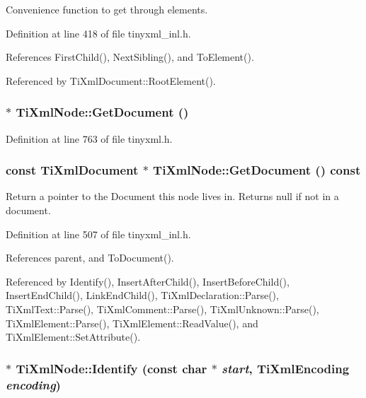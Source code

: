 Convenience function to get through elements. 

Definition at line 418 of file tinyxml\_\-inl.h.

References FirstChild(), NextSibling(), and ToElement().

Referenced by TiXmlDocument::RootElement().\hypertarget{class_ti_xml_node_a7b2372c0e7adfb32f5b6902fe49a39b2}{
\subsubsection[{GetDocument}]{$\ast$ TiXmlNode::GetDocument ()}}
\label{class_ti_xml_node_a7b2372c0e7adfb32f5b6902fe49a39b2}


Definition at line 763 of file tinyxml.h.\hypertarget{class_ti_xml_node_aa66f4ebcd175204a168ed7c2d7b43071}{
\subsubsection[{GetDocument}]{\setlength{\rightskip}{0pt plus 5cm}const {\bf TiXmlDocument} $\ast$ TiXmlNode::GetDocument () const}}
\label{class_ti_xml_node_aa66f4ebcd175204a168ed7c2d7b43071}
Return a pointer to the Document this node lives in. Returns null if not in a document. 

Definition at line 507 of file tinyxml\_\-inl.h.

References parent, and ToDocument().

Referenced by Identify(), InsertAfterChild(), InsertBeforeChild(), InsertEndChild(), LinkEndChild(), TiXmlDeclaration::Parse(), TiXmlText::Parse(), TiXmlComment::Parse(), TiXmlUnknown::Parse(), TiXmlElement::Parse(), TiXmlElement::ReadValue(), and TiXmlElement::SetAttribute().\hypertarget{class_ti_xml_node_ac1e3a8e7578be463b04617786120c2bb}{
\subsubsection[{Identify}]{ $\ast$ TiXmlNode::Identify (const char $\ast$ {\em start}, \/  {\bf TiXmlEncoding} {\em encoding})}}
\label{class_ti_xml_node_ac1e3a8e7578be463b04617786120c2bb}


